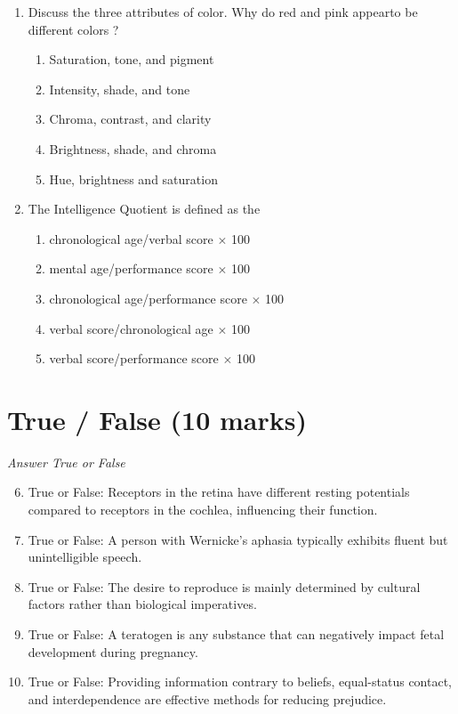 \documentclass[12pt]{article}
\begin{document}
\begin{enumerate}[label=\arabic*.]
\begin{enumerate}[label=(\alph*)]
    \item specificity theory
    \item trichromatic
    \item gestalt theory
\end{enumerate}
\item Discuss the three attributes of color. Why do red and pink appearto be different colors ?
\begin{enumerate}[label=(\alph*)]
    \item Saturation, tone, and pigment
    \item Intensity, shade, and tone
    \item Chroma, contrast, and clarity
    \item Brightness, shade, and chroma
    \item Hue, brightness and saturation
\end{enumerate}
\item The Intelligence Quotient is defined as the
\begin{enumerate}[label=(\alph*)]
    \item chronological age/verbal score \ensuremath{\times} 100
    \item mental age/performance score \ensuremath{\times} 100
    \item chronological age/performance score \ensuremath{\times} 100
    \item verbal score/chronological age \ensuremath{\times} 100
    \item verbal score/performance score \ensuremath{\times} 100
\end{enumerate}
\end{enumerate}

\section*{True / False (10 marks)}
\textit{Answer True or False}
\begin{enumerate}[label=\arabic*.]
\setcounter{enumi}{5}
\item True or False: Receptors in the retina have different resting potentials compared to receptors in the cochlea, influencing their function.
\item True or False: A person with Wernicke's aphasia typically exhibits fluent but unintelligible speech.
\item True or False: The desire to reproduce is mainly determined by cultural factors rather than biological imperatives.
\item True or False: A teratogen is any substance that can negatively impact fetal development during pregnancy.
\item True or False: Providing information contrary to beliefs, equal-status contact, and interdependence are effective methods for reducing prejudice.
\end{enumerate}
\end{document}
